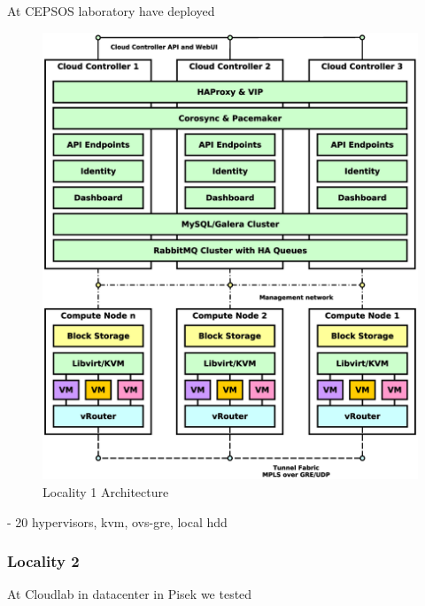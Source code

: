 At CEPSOS laboratory have deployed 

\begin{figure}[!h]
\centering
\includegraphics[scale=.2]{img/use_case_ha_gre.eps}
\caption{Locality 1 Architecture}
\label{fig:cm}
\end{figure}

- 20 hypervisors, kvm, ovs-gre, local hdd

\subsubsection{Locality 2}

At Cloudlab in datacenter in Pisek we tested

